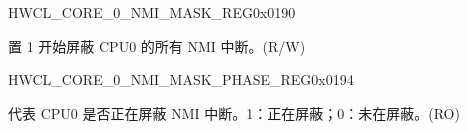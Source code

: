 \begin{register}{H}{WCL\_CORE\_0\_NMI\_MASK\_REG}{0x0190}\label{regdesc:WCLCORE0NMIMASKREG}
%
%
\regnewline%
\begin{regdesc}\begin{reglist}
\label{fielddesc:WCLCORE0NMIMASK}\item [WCL\_CORE\_0\_NMI\_MASK] 置 1 开始屏蔽 CPU0 的所有 NMI 中断。(R/W)
\end{reglist}\end{regdesc}
\end{register}


\begin{register}{H}{WCL\_CORE\_0\_NMI\_MASK\_PHASE\_REG}{0x0194}\label{regdesc:WCLCORE0NMIMASKPHASEREG}
%
%
\regnewline%
\begin{regdesc}\begin{reglist}
\label{fielddesc:WCLCORE0NMIMASKPHASE}\item [WCL\_CORE\_0\_NMI\_MASK\_PHASE] 代表 CPU0 是否正在屏蔽 NMI 中断。1：正在屏蔽；0：未在屏蔽。(RO)
\end{reglist}\end{regdesc}
\end{register}
















































